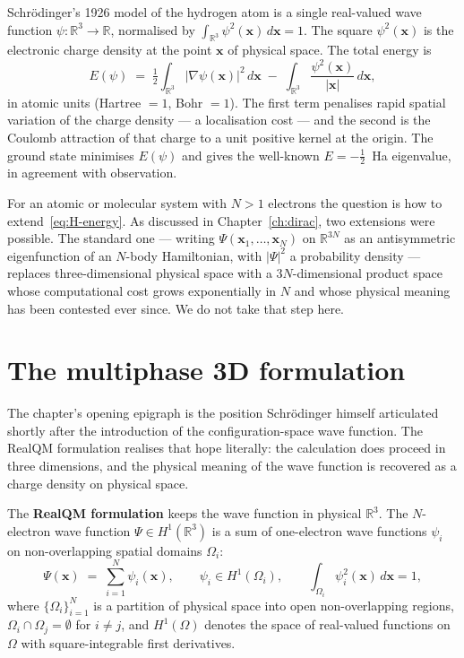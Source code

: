 Schr\"odinger's 1926 model of the hydrogen atom is a single real-valued wave function $\psi : \mathbb{R}^3 \to \mathbb{R}$, normalised by $\int_{\mathbb{R}^3} \psi^2(\mathbf{x})\, d\mathbf{x} = 1$. The square $\psi^2(\mathbf{x})$ is the electronic charge density at the point $\mathbf{x}$ of physical space. The total energy is
\begin{equation}\label{eq:H-energy}
E(\psi) \;=\; \tfrac{1}{2} \int_{\mathbb{R}^3} |\nabla \psi(\mathbf{x})|^2\, d\mathbf{x}
\;-\; \int_{\mathbb{R}^3} \frac{\psi^2(\mathbf{x})}{|\mathbf{x}|}\, d\mathbf{x},
\end{equation}
in atomic units (Hartree $= 1$, Bohr $= 1$). The first term penalises rapid spatial variation of the charge density --- a localisation cost --- and the second is the Coulomb attraction of that charge to a unit positive kernel at the origin. The ground state minimises $E(\psi)$ and gives the well-known $E = -\tfrac{1}{2}$~Ha eigenvalue, in agreement with observation.

For an atomic or molecular system with $N>1$ electrons the question is how to extend~\eqref{eq:H-energy}. As discussed in Chapter~\ref{ch:dirac}, two extensions were possible. The standard one --- writing $\Psi(\mathbf{x}_1, \ldots, \mathbf{x}_N)$ on $\mathbb{R}^{3N}$ as an antisymmetric eigenfunction of an $N$-body Hamiltonian, with $|\Psi|^2$ a probability density --- replaces three-dimensional physical space with a $3N$-dimensional product space whose computational cost grows exponentially in $N$ and whose physical meaning has been contested ever since. We do not take that step here.

\section{The multiphase 3D formulation}\label{sec:multiphase}

The chapter's opening epigraph is the position Schr\"odinger himself articulated shortly after the introduction of the configuration-space wave function. The RealQM formulation realises that hope literally: the calculation does proceed in three dimensions, and the physical meaning of the wave function is recovered as a charge density on physical space.

The \textbf{RealQM formulation} keeps the wave function in physical $\mathbb{R}^3$. The $N$-electron wave function $\Psi \in H^1(\mathbb{R}^3)$ is a sum of one-electron wave functions $\psi_i$ on non-overlapping spatial domains $\Omega_i$:
\begin{equation}\label{eq:Psi-sum}
\Psi(\mathbf{x}) \;=\; \sum_{i=1}^{N} \psi_i(\mathbf{x}),
\qquad \psi_i \in H^1(\Omega_i), \qquad \int_{\Omega_i} \psi_i^2(\mathbf{x})\, d\mathbf{x} = 1,
\end{equation}
where $\{\Omega_i\}_{i=1}^{N}$ is a partition of physical space into open non-overlapping regions, $\Omega_i \cap \Omega_j = \emptyset$ for $i \ne j$, and $H^1(\Omega)$ denotes the space of real-valued functions on $\Omega$ with square-integrable first derivatives.

